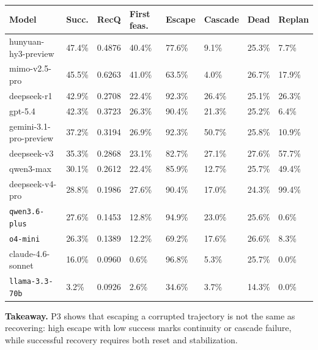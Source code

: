 \begin{center}
\label{tab:appendix_p3_full}
\scriptsize
\setlength{\tabcolsep}{3.5pt}
\renewcommand{\arraystretch}{1.08}
\begin{tabular}{llllllll}
\toprule
Model & Succ. & RecQ & First feas. & Escape & Cascade & Dead & Replan \\
\midrule
hunyuan-hy3-preview & 47.4\% & 0.4876 & 40.4\% & 77.6\% & 9.1\% & 25.3\% & 7.7\% \\
mimo-v2.5-pro & 45.5\% & 0.6263 & 41.0\% & 63.5\% & 4.0\% & 26.7\% & 17.9\% \\
deepseek-r1 & 42.9\% & 0.2708 & 22.4\% & 92.3\% & 26.4\% & 25.1\% & 26.3\% \\
gpt-5.4 & 42.3\% & 0.3723 & 26.3\% & 90.4\% & 21.3\% & 25.2\% & 6.4\% \\
gemini-3.1-pro-preview & 37.2\% & 0.3194 & 26.9\% & 92.3\% & 50.7\% & 25.8\% & 10.9\% \\
deepseek-v3 & 35.3\% & 0.2868 & 23.1\% & 82.7\% & 27.1\% & 27.6\% & 57.7\% \\
qwen3-max & 30.1\% & 0.2612 & 22.4\% & 85.9\% & 12.7\% & 25.7\% & 49.4\% \\
deepseek-v4-pro & 28.8\% & 0.1986 & 27.6\% & 90.4\% & 17.0\% & 24.3\% & 99.4\% \\
\texttt{qwen3.6-plus} & 27.6\% & 0.1453 & 12.8\% & 94.9\% & 23.0\% & 25.6\% & 0.6\% \\
\texttt{o4-mini} & 26.3\% & 0.1389 & 12.2\% & 69.2\% & 17.6\% & 26.6\% & 8.3\% \\
claude-4.6-sonnet & 16.0\% & 0.0960 & 0.6\% & 96.8\% & 5.3\% & 25.7\% & 0.0\% \\
\texttt{llama-3.3-70b} & 3.2\% & 0.0926 & 2.6\% & 34.6\% & 3.7\% & 14.3\% & 0.0\% \\
\bottomrule
\end{tabular}
\end{center}

\noindent\textbf{Takeaway.} P3 shows that escaping a corrupted trajectory is not the same as recovering: high escape with low success marks continuity or cascade failure, while successful recovery requires both reset and stabilization.

